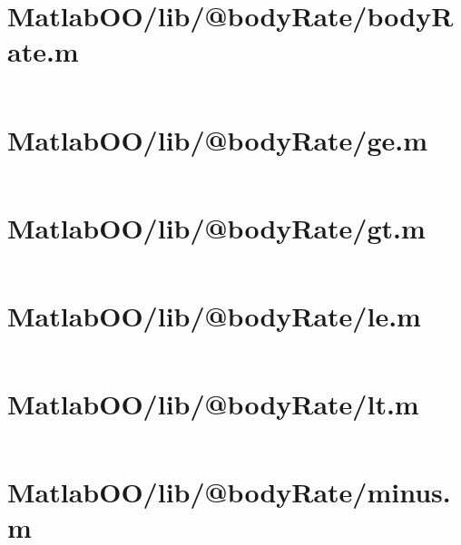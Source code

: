 \pagebreak
\section*{MatlabOO/lib/@bodyRate/bodyRate.m}\label{code:MatlabOO/lib/@bodyRate/bodyRate.m}
\inputminted[linenos,fontsize=\scriptsize]{matlab}{/home/dcouture/git/mathyourlife/TSatPy/beta_versions/matlab_object_oriented/lib/@bodyRate/bodyRate.m}

\pagebreak
\section*{MatlabOO/lib/@bodyRate/ge.m}\label{code:MatlabOO/lib/@bodyRate/ge.m}
\inputminted[linenos,fontsize=\scriptsize]{matlab}{/home/dcouture/git/mathyourlife/TSatPy/beta_versions/matlab_object_oriented/lib/@bodyRate/ge.m}

\pagebreak
\section*{MatlabOO/lib/@bodyRate/gt.m}\label{code:MatlabOO/lib/@bodyRate/gt.m}
\inputminted[linenos,fontsize=\scriptsize]{matlab}{/home/dcouture/git/mathyourlife/TSatPy/beta_versions/matlab_object_oriented/lib/@bodyRate/gt.m}

\pagebreak
\section*{MatlabOO/lib/@bodyRate/le.m}\label{code:MatlabOO/lib/@bodyRate/le.m}
\inputminted[linenos,fontsize=\scriptsize]{matlab}{/home/dcouture/git/mathyourlife/TSatPy/beta_versions/matlab_object_oriented/lib/@bodyRate/le.m}

\pagebreak
\section*{MatlabOO/lib/@bodyRate/lt.m}\label{code:MatlabOO/lib/@bodyRate/lt.m}
\inputminted[linenos,fontsize=\scriptsize]{matlab}{/home/dcouture/git/mathyourlife/TSatPy/beta_versions/matlab_object_oriented/lib/@bodyRate/lt.m}

\pagebreak
\section*{MatlabOO/lib/@bodyRate/minus.m}\label{code:MatlabOO/lib/@bodyRate/minus.m}
\inputminted[linenos,fontsize=\scriptsize]{matlab}{/home/dcouture/git/mathyourlife/TSatPy/beta_versions/matlab_object_oriented/lib/@bodyRate/minus.m}

